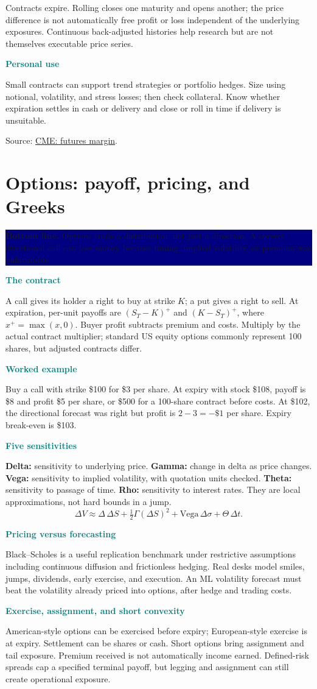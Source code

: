\documentclass[10pt,letterpaper]{article}
\newcommand{\bl}[1]{\noindent\colorbox{navy}{\parbox{\dimexpr\linewidth-2\fboxsep}{\color{white}\textbf{Bottom line.} #1}}\par\medskip}
\newcommand{\topic}[2]{\clearpage\section{#1}\bl{#2}}
\newcommand{\sub}[1]{\par\textbf{\textcolor{teal}{#1}}\par}
\newcommand{\ex}[1]{\sub{Worked example}#1}
\newcommand{\src}[2]{\par{\footnotesize Source: \href{#1}{#2}.}}
\begin{document}
Contracts expire. Rolling closes one maturity and opens another; the price difference is not automatically free profit or loss independent of the underlying exposures. Continuous back-adjusted histories help research but are not themselves executable price series.
\sub{Personal use}
Small contracts can support trend strategies or portfolio hedges. Size using notional, volatility, and stress losses; then check collateral. Know whether expiration settles in cash or delivery and close or roll in time if delivery is unsuitable.
\src{https://www.cmegroup.com/education/courses/understanding-the-benefits-of-futures/the-benefits-of-futures-margins}{CME: futures margin}
\topic{Options: payoff, pricing, and Greeks}{Options trade a distribution, not just a direction. A correct directional call can lose money because timing, implied volatility, or premium was unfavorable.}
\sub{The contract}
A call gives its holder a right to buy at strike $K$; a put gives a right to sell. At expiration, per-unit payoffs are $(S_T-K)^+$ and $(K-S_T)^+$, where $x^+=\max(x,0)$. Buyer profit subtracts premium and costs. Multiply by the actual contract multiplier; standard US equity options commonly represent 100 shares, but adjusted contracts differ.
\ex{Buy a call with strike \$100 for \$3 per share. At expiry with stock \$108, payoff is \$8 and profit \$5 per share, or \$500 for a 100-share contract before costs. At \$102, the directional forecast was right but profit is $2-3=-\$1$ per share. Expiry break-even is \$103.}
\sub{Five sensitivities}
\textbf{Delta:} sensitivity to underlying price. \textbf{Gamma:} change in delta as price changes. \textbf{Vega:} sensitivity to implied volatility, with quotation units checked. \textbf{Theta:} sensitivity to passage of time. \textbf{Rho:} sensitivity to interest rates. They are local approximations, not hard bounds in a jump.
\[\Delta V\approx\Delta\,\Delta S+\tfrac12\Gamma(\Delta S)^2
+\text{Vega}\,\Delta\sigma+\Theta\,\Delta t.\]
\sub{Pricing versus forecasting}
Black--Scholes is a useful replication benchmark under restrictive assumptions including continuous diffusion and frictionless hedging. Real desks model smiles, jumps, dividends, early exercise, and execution. An ML volatility forecast must beat the volatility already priced into options, after hedge and trading costs.
\sub{Exercise, assignment, and short convexity}
American-style options can be exercised before expiry; European-style exercise is at expiry. Settlement can be shares or cash. Short options bring assignment and tail exposure. Premium received is not automatically income earned. Defined-risk spreads cap a specified terminal payoff, but legging and assignment can still create operational exposure.
\end{document}
